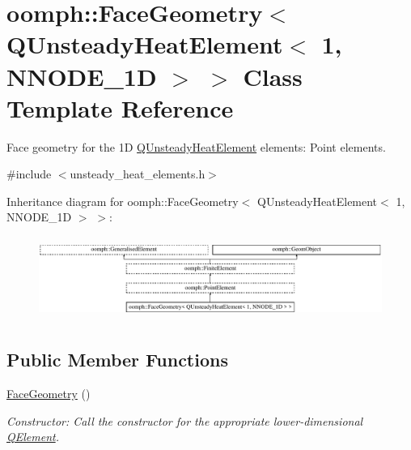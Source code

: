 \hypertarget{classoomph_1_1FaceGeometry_3_01QUnsteadyHeatElement_3_011_00_01NNODE__1D_01_4_01_4}{}\section{oomph\+:\+:Face\+Geometry$<$ Q\+Unsteady\+Heat\+Element$<$ 1, N\+N\+O\+D\+E\+\_\+1D $>$ $>$ Class Template Reference}
\label{classoomph_1_1FaceGeometry_3_01QUnsteadyHeatElement_3_011_00_01NNODE__1D_01_4_01_4}


Face geometry for the 1D \hyperlink{classoomph_1_1QUnsteadyHeatElement}{Q\+Unsteady\+Heat\+Element} elements\+: Point elements.  




{\ttfamily \#include $<$unsteady\+\_\+heat\+\_\+elements.\+h$>$}

Inheritance diagram for oomph\+:\+:Face\+Geometry$<$ Q\+Unsteady\+Heat\+Element$<$ 1, N\+N\+O\+D\+E\+\_\+1D $>$ $>$\+:\begin{figure}[H]
\begin{center}
\leavevmode
\includegraphics[height=2.731707cm]{classoomph_1_1FaceGeometry_3_01QUnsteadyHeatElement_3_011_00_01NNODE__1D_01_4_01_4}
\end{center}
\end{figure}
\subsection*{Public Member Functions}
\begin{DoxyCompactItemize}
\item 
\hyperlink{classoomph_1_1FaceGeometry_3_01QUnsteadyHeatElement_3_011_00_01NNODE__1D_01_4_01_4_a8289eb012fff70c662ee87d1576451b6}{Face\+Geometry} ()
\begin{DoxyCompactList}\small\item\em Constructor\+: Call the constructor for the appropriate lower-\/dimensional \hyperlink{classoomph_1_1QElement}{Q\+Element}. \end{DoxyCompactList}\end{DoxyCompactItemize}
